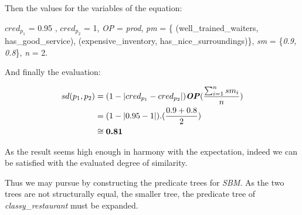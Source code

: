 Then the values for the variables of the equation:

$cred_{p_{1}}$ = 0.95 , $cred_{p_{2}}$ = 1,  \emph{OP} = \textit{prod},  \textit{pm} = \{ (well\_trained\_waiters, has\_good\_service), (expensive\_inventory, has\_nice\_surroundings)\}, \textit{sm} = \{\textit{0.9, 0.8}\}, \textit{n} = 2.

And finally the evaluation:

\begin{equation}\label{eq:sdE3}
\begin{split}
\textit{$sd(p_{1}, p_{2})$} &=   (1-\lvert  \textit{$cred_{p_{1}}$} - \textit{$cred_{p_{2}}$}  \rvert) \textbf{\emph{OP}} (\frac{\sum_{i=1}^{n} sm_i}{n})\\
 &=   (1-\lvert  0.95 - 1  \rvert) . (\frac{0.9 + 0.8}{2}) \\
&\cong{\textbf{0.81}}
 \end{split} 
\end{equation}

As the result seems high enough in harmony with the expectation, indeed we can be satisfied with the evaluated degree of similarity. 

Thus we may pursue by constructing the predicate trees for  \textit{SBM}. As the two trees are not structurally equal, the smaller tree, the predicate tree of \textit{classy\_restaurant} must be expanded.



